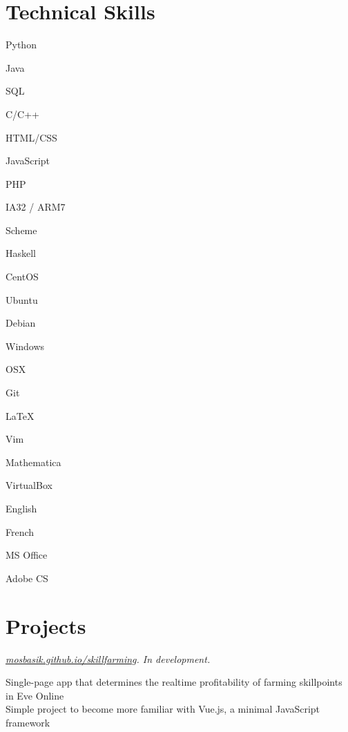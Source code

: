 \documentclass[10pt,letterpaper, full]{article}
\newcommand{\pjtitle}[1]{\renewcommand{\givenpjtitle}{#1}}
\newcommand{\pjtime}[1]{\renewcommand{\givenpjtime}{#1}}
\newcommand{\pjbody}[1]{\renewcommand{\givenpjbody}{#1}}
\newcommand{\givenpjtitle}{REQUIRED!}
\newcommand{\givenpjtime}{REQUIRED!}
\newcommand{\givenpjbody}{REQUIRED!}
\newenvironment{projectenv}
    {
        \begin{adjustwidth}{1em}{0em}
    }
    {
        \textit{\givenpjtitle. \givenpjtime.}

        \begin{minipage}[l]{\textwidth}
            \givenpjbody%
        \end{minipage}\\%


        \end{adjustwidth}
    }
\begin{document}
\section{Technical Skills}
\begin{adjustwidth}{1em}{0em}
    \begin{minipage}[t]{.195\textwidth}
        Python

        Java

        SQL

        C/C++

        HTML/CSS

    \end{minipage}%
    \begin{minipage}[t]{.195\textwidth}
        JavaScript

        PHP

        IA32 / ARM7

        Scheme

        Haskell
    \end{minipage}%
    \begin{minipage}[t]{.195\textwidth}
        CentOS

        Ubuntu

        Debian

        Windows

        OSX
    \end{minipage}%
    \begin{minipage}[t]{.195\textwidth}
        Git

        \LaTeX

        Vim

        Mathematica

        VirtualBox
    \end{minipage}%
    \begin{minipage}[t]{.195\textwidth}
        English

        French

        MS Office

        Adobe CS
    \end{minipage}%
\end{adjustwidth}


\section{Projects}
\begin{projectenv}
    \pjtitle{\href{http://mosbasik.github.io/skillfarming}{mosbasik.github.io/skillfarming}}
    \pjtime{In development}
    \pjbody{
        Single-page app that determines the realtime profitability of farming skillpoints in Eve Online\\
        Simple project to become more familiar with Vue.js, a minimal JavaScript framework
    }%
\end{projectenv}%
\end{document}
